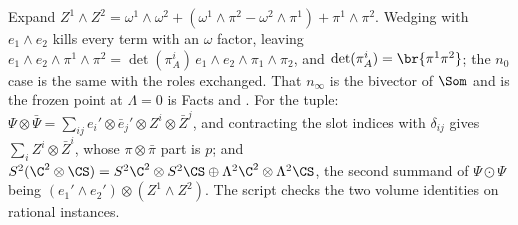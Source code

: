 Expand $Z^{1} \wedge Z^{2} = \omega^{1}\wedge\omega^{2} + (\omega^{1}\wedge\pi^{2} - \omega^{2}\wedge\pi^{1}) + \pi^{1}\wedge\pi^{2}$. Wedging with $e_{1} \wedge e_{2}$ kills every term with an $\omega$ factor, leaving $e_{1}\wedge e_{2}\wedge\pi^{1}\wedge\pi^{2} = \det(\pi^{i}_{A})\,e_{1}\wedge e_{2}\wedge\pi_{1}\wedge\pi_{2}$, and $\det(\pi^{i}_{A}) = \br{\pi^{1}\pi^{2}}$; the $n_{0}$ case is the same with the roles exchanged. That $n_{\infty}$ is the bivector of $\Som$ and is the frozen point at $\Lambda = 0$ is Facts  and . For the tuple: $\Psi \otimes \bar\Psi = \sum_{ij} e_{i}' \otimes \bar e_{j}' \otimes Z^{i} \otimes \bar Z^{j}$, and contracting the slot indices with $\delta_{ij}$ gives $\sum_{i} Z^{i} \otimes \bar Z^{i}$, whose $\pi \otimes \bar\pi$ part is $p$; and $S^{2}(\C^{2} \otimes \CS) = S^{2}\C^{2} \otimes S^{2}\CS \oplus \Lambda^{2}\C^{2} \otimes \Lambda^{2}\CS$, the second summand of $\Psi \odot \Psi$ being $(e_{1}' \wedge e_{2}') \otimes (Z^{1} \wedge Z^{2})$. The script checks the two volume identities on rational instances.
